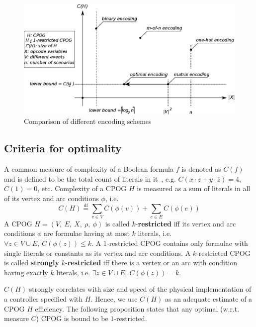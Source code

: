 \begin{figure}[h]
\begin{centering}
\includegraphics[width=0.75\columnwidth]{fig/encodings}

\par\end{centering}

\caption{Comparison of different encoding schemes\label{fig-Size-of-specification}}
\end{figure}

\subsection{Criteria for optimality\label{sec:Criteria-for-optimality}}

A common measure of complexity of a Boolean formula $f$ is denoted
as $C(f)$ and is defined to be the total count of literals in it~\cite{1987_wegener_book},
e.g. $C(x\cdot z+y\cdot\overline{z})=4$, $C(1)=0$, etc. Complexity
of a CPOG $H$ is measured as a sum of literals in all of its vertex
and arc conditions $\phi$, i.e.
\[
C(H)\overset{\textrm{df}}{=}\sum_{v\in V}C(\phi(v))+\sum_{e\in E}C(\phi(e))
\]
A CPOG $H=(V,\ E,\ X,\ \rho,\ \phi)$ is called $k$-\textbf{restricted}
iff its vertex and arc conditions $\phi$ are formulae having at most
$k$ literals, i.e. $\forall z\in V\cup E,\ C(\phi(z))\le k$. A \emph{$1$-}restricted
CPOG contains only formulae with single literals or constants as its
vertex and arc conditions. A $k$-restricted CPOG is called \textbf{strongly}
$k$-\textbf{restricted} iff there is a vertex or an arc with condition
having exactly $k$ literals, i.e. $\exists z\in V\cup E,\ C(\phi(z))=k$.

$C(H)$ strongly correlates with size and speed of the physical implementation
of a controller specified with $H$. Hence, we use $C(H)$ as an adequate
estimate of a CPOG $H$ efficiency. The following proposition states
that any optimal (w.r.t. measure $C$) CPOG is bound to be $1$-restricted.


